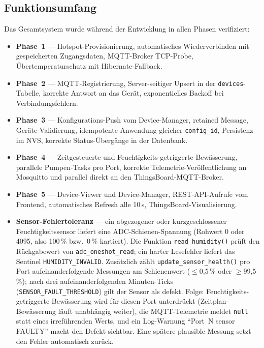 \documentclass[a4paper,12pt]{article}
\begin{document}
\subsection{Funktionsumfang}

Das Gesamtsystem wurde während der Entwicklung in allen Phasen
verifiziert:

\begin{itemize}
  \item \textbf{Phase~1} --- Hotspot-Provisionierung, automatisches
        Wiederverbinden mit gespeicherten Zugangsdaten, MQTT-Broker
        TCP-Probe, Übertemperaturschutz mit Hibernate-Fallback.
  \item \textbf{Phase~2} --- MQTT-Registrierung, Server-seitiger
        Upsert in der \texttt{devices}-Tabelle, korrekte Antwort an
        das Gerät, exponentielles Backoff bei Verbindungsfehlern.
  \item \textbf{Phase~3} --- Konfigurations-Push vom Device-Manager,
        retained Message, Geräte-Validierung, idempotente Anwendung
        gleicher \texttt{config\_id}, Persistenz im NVS, korrekte
        Status-Übergänge in der Datenbank.
  \item \textbf{Phase~4} --- Zeitgesteuerte und
        Feuchtigkeits-getriggerte Bewässerung, parallele Pumpen-Tasks
        pro Port, korrekte Telemetrie-Veröffentlichung an Mosquitto
        und parallel direkt an den ThingsBoard-MQTT-Broker.
  \item \textbf{Phase~5} --- Device-Viewer und Device-Manager,
        REST-API-Aufrufe vom Frontend, automatisches Refresh alle
        10\,s, ThingsBoard-Visualisierung.
  \item \textbf{Sensor-Fehlertoleranz} --- ein abgezogener oder
        kurzgeschlossener Feuchtigkeitssensor liefert eine
        ADC-Schienen-Spannung (Rohwert 0 oder 4095, also 100\,\% bzw.\
        0\,\% kartiert). Die Funktion \texttt{read\_humidity()} prüft
        den Rückgabewert von \texttt{adc\_oneshot\_read}; ein harter
        Lesefehler liefert das Sentinel \texttt{HUMIDITY\_INVALID}.
        Zusätzlich zählt \texttt{update\_sensor\_health()} pro Port
        aufeinanderfolgende Messungen am Schienenwert ($\le$0,5\,\%
        oder $\ge$99,5\,\%); nach drei aufeinanderfolgenden
        Minuten-Ticks (\texttt{SENSOR\_FAULT\_THRESHOLD}) gilt der
        Sensor als defekt. Folge: Feuchtigkeits-getriggerte
        Bewässerung wird für diesen Port unterdrückt
        (Zeitplan-Bewässerung läuft unabhängig weiter), die
        MQTT-Telemetrie meldet \texttt{null} statt eines irreführenden
        Werts, und ein Log-Warnung "`Port~N sensor FAULTY"' macht den
        Defekt sichtbar. Eine spätere plausible Messung setzt den
        Fehler automatisch zurück.
\end{itemize}
\end{document}
